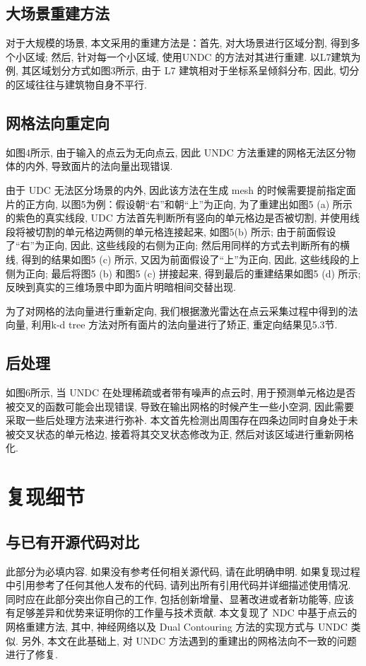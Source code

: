 \subsection{大场景重建方法}
对于大规模的场景, 本文采用的重建方法是：首先, 对大场景进行区域分割, 得到多个小区域; 然后, 针对每一个小区域, 使用UNDC 的方法对其进行重建. 以L7建筑为例, 其区域划分方式如图3所示, 由于 L7 建筑相对于坐标系呈倾斜分布, 因此, 切分的区域往往与建筑物自身不平行. 

\subsection{网格法向重定向}
如图4所示, 由于输入的点云为无向点云, 因此 UNDC 方法重建的网格无法区分物体的内外, 导致面片的法向量出现错误. 

由于 UDC 无法区分场景的内外, 因此该方法在生成 mesh 的时候需要提前指定面片的正方向, 以图5为例：假设朝“右”和朝“上”为正向, 为了重建出如图5 (a) 所示的紫色的真实线段, UDC 方法首先判断所有竖向的单元格边是否被切割, 并使用线段将被切割的单元格边两侧的单元格连接起来, 如图5(b) 所示; 由于前面假设了“右”为正向, 因此, 这些线段的右侧为正向; 然后用同样的方式去判断所有的横线, 得到的结果如图5 (c) 所示, 又因为前面假设了“上”为正向, 因此, 这些线段的上侧为正向; 最后将图5 (b) 和图5 (c) 拼接起来, 得到最后的重建结果如图5 (d) 所示; 反映到真实的三维场景中即为面片明暗相间交替出现. 

为了对网格的法向量进行重新定向, 我们根据激光雷达在点云采集过程中得到的法向量, 利用k-d tree 方法对所有面片的法向量进行了矫正, 重定向结果见5.3节. 

\subsection{后处理}
如图6所示, 当 UNDC 在处理稀疏或者带有噪声的点云时, 用于预测单元格边是否被交叉的函数可能会出现错误, 导致在输出网格的时候产生一些小空洞, 因此需要采取一些后处理方法来进行弥补. 本文首先检测出周围存在四条边同时自身处于未被交叉状态的单元格边, 接着将其交叉状态修改为正, 然后对该区域进行重新网格化. 



\section{复现细节}

\subsection{与已有开源代码对比}
此部分为必填内容. 如果没有参考任何相关源代码, 请在此明确申明. 如果复现过程中引用参考了任何其他人发布的代码, 请列出所有引用代码并详细描述使用情况. 同时应在此部分突出你自己的工作, 包括创新增量、显著改进或者新功能等, 应该有足够差异和优势来证明你的工作量与技术贡献. 
本文复现了 NDC 中基于点云的网格重建方法, 其中, 神经网络以及 Dual Contouring 方法的实现方式与 UNDC 类似. 另外, 本文在此基础上, 对 UNDC 方法遇到的重建出的网格法向不一致的问题进行了修复. 

